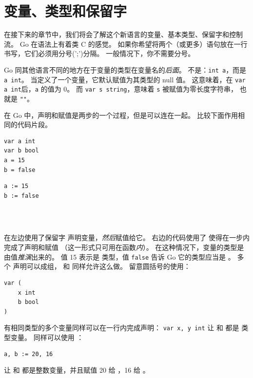 \section{变量、类型和保留字}
\label{sec:vars}
在接下来的章节中，我们将会了解这个新语言的变量、基本类型、保留字和控制流。
Go 在语法上有着类 C 的感觉。
如果你希望将两个（或更多）语句放在一行书写，它们必须用分号(';')分隔。
一般情况下，你不需要分号。

Go 同其他语言不同的地方在于变量的类型在变量名的\emph{后面}。
不是：\lstinline{int a}，而是 \lstinline{a int}。
当定义了一个变量，它默认赋值为其类型的 null 值。
这意味着，在 \lstinline{var a int}后，\lstinline{a} 的值为 0。
而 \lstinline{var s string}，意味着 \lstinline{s} 被赋值为零长度字符串，
也就是 \lstinline{""}。

在 Go 中，声明和赋值是两步的一个过程，但是可以连在一起。
比较下面作用相同的代码片段。

\begin{minipage}{.5\textwidth}
\begin{lstlisting}[linewidth=.5\textwidth,caption={Declaration with =}]
var a int
var b bool
a = 15
b = false
\end{lstlisting}
\hfill
\end{minipage}
\begin{minipage}{.5\textwidth}
\begin{lstlisting}[linewidth=.5\textwidth,caption={Declaration with :=}]
a := 15
b := false
\end{lstlisting}
\ \\
\ \\
\hfill
\end{minipage}

在左边使用了保留字  声明变量，\emph{然后}赋值给它。
右边的代码使用了 \mbox{\key{:=}{ }} 使得在一步内完成了声明和赋值
（这一形式只可用在函数\emph{内}）。
在这种情况下，变量的类型是由值\emph{推演}出来的。
值 15 表示是  类型，值 \texttt{false} 告诉 Go 它的类型应当是 。
多个  声明可以成组， 和  同样允许这么做。
留意圆括号的使用：
\begin{lstlisting}
var (
    x int
    b bool
)
\end{lstlisting}

有相同类型的多个变量同样可以在一行内完成声明：
\lstinline{var x, y int} 让  和  都是  类型变量。
同样可以使用 ：
\begin{lstlisting}
a, b := 20, 16
\end{lstlisting}
让  和  都是整数变量，并且赋值 20 给 ，16 给 。

